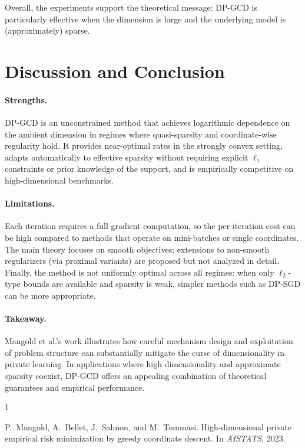 \documentclass[11pt,a4paper]{article}
\begin{document}
Overall, the experiments support the theoretical message: DP-GCD is particularly effective when the dimension is large and the underlying model is (approximately) sparse.

\section{Discussion and Conclusion}

\paragraph{Strengths.}
DP-GCD is an unconstrained method that achieves logarithmic dependence on the ambient dimension in regimes where quasi-sparsity and coordinate-wise regularity hold. It provides near-optimal rates in the strongly convex setting, adapts automatically to effective sparsity without requiring explicit \(\ell_1\) constraints or prior knowledge of the support, and is empirically competitive on high-dimensional benchmarks.

\paragraph{Limitations.}
Each iteration requires a full gradient computation, so the per-iteration cost can be high compared to methods that operate on mini-batches or single coordinates. The main theory focuses on smooth objectives; extensions to non-smooth regularizers (via proximal variants) are proposed but not analyzed in detail. Finally, the method is not uniformly optimal across all regimes: when only \(\ell_2\)-type bounds are available and sparsity is weak, simpler methods such as DP-SGD can be more appropriate.

\paragraph{Takeaway.}
Mangold et al.'s work illustrates how careful mechanism design and exploitation of problem structure can substantially mitigate the curse of dimensionality in private learning. In applications where high dimensionality and approximate sparsity coexist, DP-GCD offers an appealing combination of theoretical guarantees and empirical performance.


\begin{thebibliography}{1}

P.~Mangold, A.~Bellet, J.~Salmon, and M.~Tommasi.
High-dimensional private empirical risk minimization by greedy coordinate descent.
In \emph{AISTATS}, 2023.

\end{thebibliography}
\end{document}
